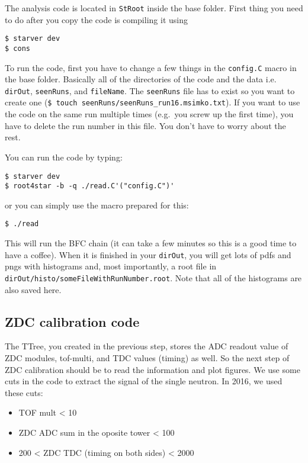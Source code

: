 The analysis code is located in \texttt{StRoot} inside the base folder. First thing you need to do after you
copy the code is compiling it using
\begin{verbatim}
$ starver dev
$ cons
\end{verbatim}
To run the code, first you have to change a few things in the \texttt{config.C} macro in the base folder. 
Basically all of the
directories of the code and the data i.e. \texttt{dirOut}, \texttt{seenRuns}, and \texttt{fileName}. 
The \texttt{seenRuns} file has to
exist so you want to create one (\texttt{\$ touch seenRuns/seenRuns\_run16.msimko.txt}). If you want to use the code
on the same run multiple times (e.g.\ you screw up the first time), you have to delete the run number in
this file. You don't have to worry
about the rest.

You can run the code by typing:
\begin{verbatim}
$ starver dev
$ root4star -b -q ./read.C'("config.C")'
\end{verbatim}
or you can simply use the macro prepared for this:
\begin{verbatim}
$ ./read
\end{verbatim}
This will run the BFC chain (it can take a few minutes so this is a good time to have a coffee). When it is finished
in your \texttt{dirOut}, you will get lots of pdfs and pngs with histograms and, most importantly, a root file in
\texttt{dirOut/histo/someFileWithRunNumber.root}. Note that all of the histograms are also saved here.

\subsection{ZDC calibration code}\hypertarget{zdc-calibration-code}{}\label{zdc-calibration-code}



The TTree, you created in the previous step, stores the ADC readout value of ZDC modules, tof-multi, and
TDC values (timing) as well. 
So the next step of ZDC calibration
should be to read the information and plot figures.
We use some cuts in the code to extract the signal of the single neutron. In 2016, we used these cuts:

\begin{itemize}
\item TOF mult \textless{} 10
\item ZDC ADC sum in the oposite tower \textless{} 100
\item 200 \textless{} ZDC TDC (timing on both sides) \textless{} 2000
\end{itemize}

